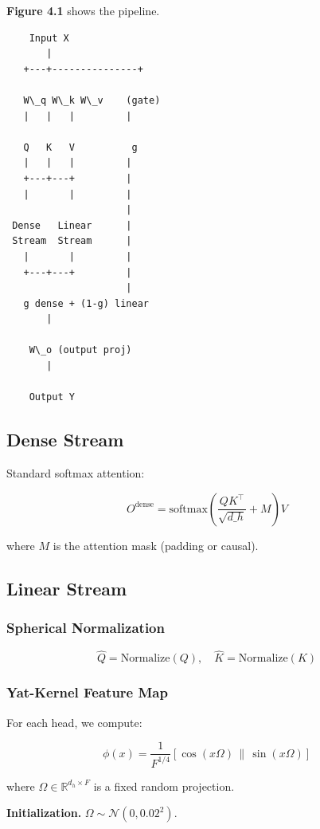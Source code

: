 \textbf{Figure 4.1} shows the pipeline.

\begin{lstlisting}
    Input X
       |
   +---+---------------+
                        
   W\_q W\_k W\_v    (gate)
   |   |   |         |
                      
   Q   K   V          g
   |   |   |         |
   +---+---+         |
   |       |         |
                     |
 Dense   Linear      |
 Stream  Stream      |
   |       |         |
   +---+---+         |
                     |
   g dense + (1-g) linear
       |
        
    W\_o (output proj)
       |
        
    Output Y
\end{lstlisting}

\subsection{Dense Stream}

Standard softmax attention:

\[
O^\text{dense} = \text{softmax}\!\left(\frac{Q K^\top}{\sqrt{d\_h}} + M\right) V
\]

where $M$ is the attention mask (padding or causal).

\subsection{Linear Stream}

\subsubsection{Spherical Normalization}

\[
\hat{Q} = \text{Normalize}(Q), \quad
\hat{K} = \text{Normalize}(K)
\]

\subsubsection{Yat-Kernel Feature Map}

For each head, we compute:

\[
\phi(x) = \frac{1}{F^{1/4}} \left[ \cos(x \Omega) \,\|\, \sin(x \Omega) \right]
\]

where $\Omega \in \mathbb{R}^{d_h \times F}$ is a fixed random projection.

\textbf{Initialization.} $\Omega \sim \mathcal{N}(0, 0.02^2)$.

